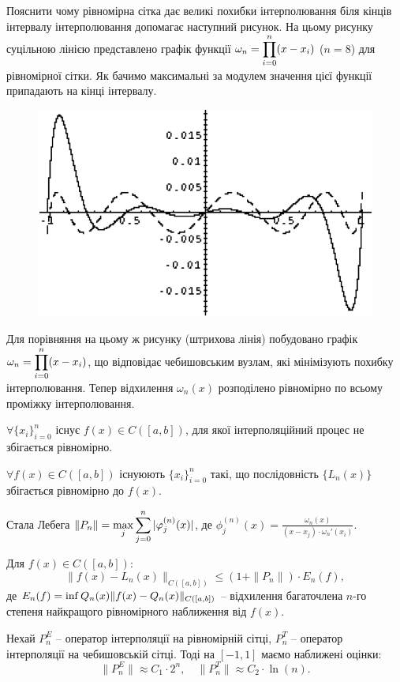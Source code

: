 Пояснити чому рівномірна сітка дає великі похибки інтерполювання біля кінців інтервалу інтерполювання допомагає наступний рисунок. На цьому рисунку суцільною лінією представлено графік функції $\omega_n = \displaystyle\prod\limits_{i=0}^n (x-x_i)$ ($n=8$) для рівномірної сітки. Як бачимо максимальні за модулем значення цієї функції припадають на кінці інтервалу.

\begin{figure}[H]
    \centering
    \includegraphics[width=.5\linewidth]{mal-6.png}
\end{figure}

Для порівняння на цьому ж рисунку (штрихова лінія) побудовано графік $\omega_n = \displaystyle\prod\limits_{i=0}^n (x-x_i)$, що відповідає чебишовським вузлам, які мінімізують похибку інтерполювання. Тепер відхилення $\omega_n(x)$ розподілено рівномірно по всьому проміжку інтерполювання.

\begin{theorem}[Фабера]
    $\forall \{x_i\}_{i=0}^n$ існує $f(x)\in C([a,b])$, для якої інтерполяційний процес не збігається рівномірно.
\end{theorem}

\begin{theorem}[Марцинкевича]
    $\forall f(x) \in C([a,b])$ існуюють $\{x_i\}_{i=0}^n$ такі, що послідовність $\{L_n(x)\}$ збігається рівномірно до $f(x)$.
\end{theorem}

\begin{theorem}
    Стала Лебега $\|P_n\| = \displaystyle\max\limits_{j} \displaystyle\sum\limits_{j=0}^n |\varphi_j^{(n)}(x)|$, де $\phi_j^{(n)}(x) = \frac{\omega_n(x)}{(x-x_j)\cdot\omega_n'(x_i)}$.
\end{theorem}

\begin{theorem}
    Для $f(x)\in C([a,b])$:
    \[\|f(x)-L_n(x)\|_{C([a,b])} \le (1 + \|P_n\|) \cdot E_n(f),\]
    де $E_n(f) = \displaystyle\inf\limits{Q_n(x)} \|f(x)-Q_n(x)\|_{C([a,b])}$ -- відхилення багаточлена $n$-го степеня найкращого рівномірного наближення від $f(x)$.
\end{theorem}

\begin{theorem}
    Нехай $P_n^E$ -- оператор інтерполяції на рівномірній сітці, $P_n^T$ -- оператор інтерполяції на чебишовській сітці. Тоді на $[-1,1]$ маємо наближені оцінки:
    \[ \|P_n^E\|\approx C_1 \cdot 2^n, \quad \|P_n^T\|\approx C_2\cdot \ln(n).\]
\end{theorem}

